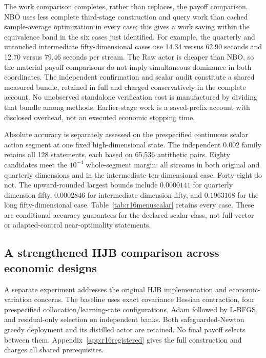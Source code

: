 

The work comparison completes, rather than replaces, the payoff comparison. NBO uses less complete third-stage construction and query work than cached sample-average optimization in every case; this gives a work saving within the equivalence band in the six cases just identified. For example, the quarterly and untouched intermediate fifty-dimensional cases use 14.34 versus 62.90 seconds and 12.70 versus 79.46 seconds per stream. The Raw actor is cheaper than NBO, so the material payoff comparisons do not imply simultaneous dominance in both coordinates. The independent confirmation and scalar audit constitute a shared measured bundle, retained in full and charged conservatively in the complete account. No unobserved standalone verification cost is manufactured by dividing that bundle among methods. Earlier-stage work is a saved-prefix account with disclosed overhead, not an executed economic stopping time.

Absolute accuracy is separately assessed on the prespecified continuous scalar action segment at one fixed high-dimensional state. The independent $0.002$ family retains all 128 statements, each based on 65,536 antithetic pairs. Eighty candidates meet the $10^{-4}$ whole-segment margin: all streams in both original and quarterly dimensions and in the intermediate ten-dimensional case. Forty-eight do not. The upward-rounded largest bounds include $0.0000141$ for quarterly dimension fifty, $0.0002846$ for intermediate dimension fifty, and $0.1963168$ for the long fifty-dimensional case. Table~\ref{tab:r16menuscalar} retains every case. These are conditional accuracy guarantees for the declared scalar class, not full-vector or adapted-control near-optimality statements.

\subsection{A strengthened HJB comparison across economic designs}
\label{sec:r16completedrobust}
A separate experiment addresses the original HJB implementation and economic-variation concerns. The baseline uses exact covariance Hessian contraction, four prespecified collocation/learning-rate configurations, Adam followed by L-BFGS, and residual-only selection on independent banks. Both safeguarded-Newton greedy deployment and its distilled actor are retained. No final payoff selects between them. Appendix~\ref{app:r16registered} gives the full construction and charges all shared prerequisites.

